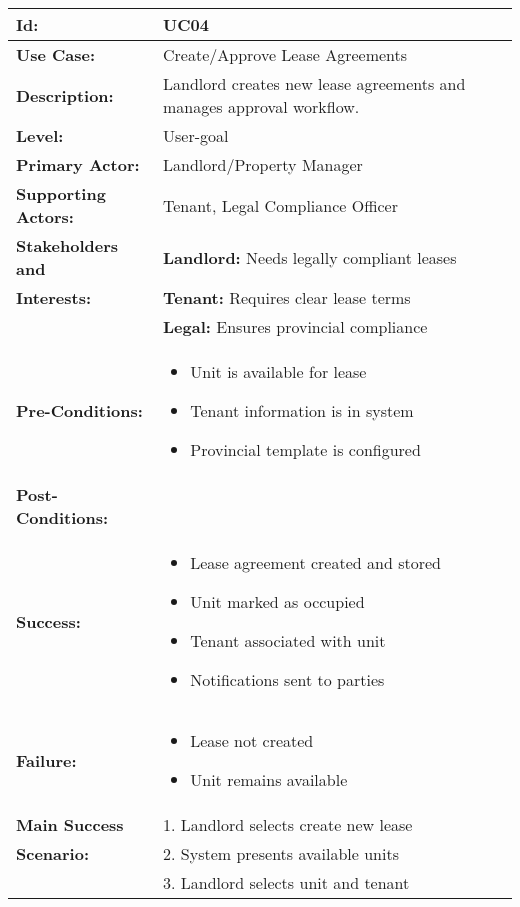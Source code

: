 \documentclass[12pt]{article}
\begin{document}
\begin{tabular}{|p{3cm}|p{11cm}|}
\hline
\textbf{Id:} & UC04 \\
\hline
\textbf{Use Case:} & Create/Approve Lease Agreements \\
\hline
\textbf{Description:} & Landlord creates new lease agreements and manages approval workflow. \\
\hline
\textbf{Level:} & User-goal \\
\hline
\textbf{Primary Actor:} & Landlord/Property Manager \\
\hline
\textbf{Supporting Actors:} & Tenant, Legal Compliance Officer \\
\hline
\textbf{Stakeholders and} & \textbf{Landlord:} Needs legally compliant leases \\
\textbf{Interests:} & \textbf{Tenant:} Requires clear lease terms \\
& \textbf{Legal:} Ensures provincial compliance \\
\hline
\textbf{Pre-Conditions:} & 
\begin{itemize}
    \item Unit is available for lease
    \item Tenant information is in system
    \item Provincial template is configured
\end{itemize} \\
\hline
\textbf{Post-Conditions:} & \\
\textbf{Success:} & 
\begin{itemize}
    \item Lease agreement created and stored
    \item Unit marked as occupied
    \item Tenant associated with unit
    \item Notifications sent to parties
\end{itemize} \\
\textbf{Failure:} & 
\begin{itemize}
    \item Lease not created
    \item Unit remains available
\end{itemize} \\
\hline
\textbf{Main Success} & 1. Landlord selects create new lease \\
\textbf{Scenario:} & 2. System presents available units \\
& 3. Landlord selects unit and tenant \\

\end{tabular}
\end{document}
